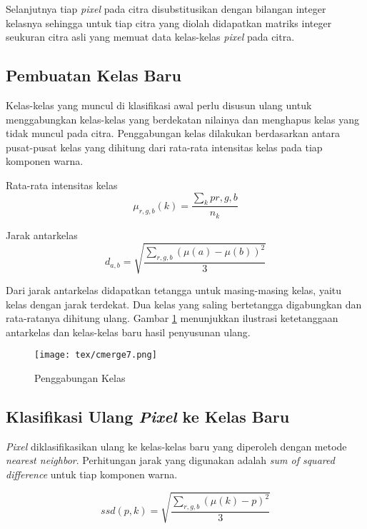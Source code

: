 \documentclass[laporan.tex]{subfiles}
\begin{document}
Selanjutnya tiap \emph{pixel} pada citra disubstitusikan dengan bilangan integer kelasnya sehingga untuk tiap citra yang diolah didapatkan matriks integer seukuran citra asli yang memuat data kelas-kelas \emph{pixel} pada citra.

\subsection{Pembuatan Kelas Baru}

Kelas-kelas yang muncul di klasifikasi awal perlu disusun ulang untuk menggabungkan kelas-kelas yang berdekatan nilainya dan menghapus kelas yang tidak muncul pada citra. Penggabungan kelas dilakukan berdasarkan antara pusat-pusat kelas yang dihitung dari rata-rata intensitas kelas pada tiap komponen warna.

Rata-rata intensitas kelas
\begin{equation}
	\mu_{r,g,b}(k) = \frac{\sum_k p{r,g,b}}{n_k}
\end{equation}

Jarak antarkelas
\begin{equation}
	d_{a,b} = \sqrt{\frac{\sum_{r,g,b} (\mu(a) - \mu(b))^2}{3}}
\end{equation}

Dari jarak antarkelas didapatkan tetangga untuk masing-masing kelas, yaitu kelas dengan jarak terdekat. Dua kelas yang saling bertetangga digabungkan dan rata-ratanya dihitung ulang. Gambar \ref{fig:neighborhood} menunjukkan ilustrasi ketetanggaan antarkelas dan kelas-kelas baru hasil penyusunan ulang.

\begin{figure}[h]
\centering
\texttt{[image: tex/cmerge7.png]}
\caption{Penggabungan Kelas}
\label{fig:neighborhood}
\end{figure}

\subsection{Klasifikasi Ulang \emph{Pixel} ke Kelas Baru}

\emph{Pixel} diklasifikasikan ulang ke kelas-kelas baru yang diperoleh dengan metode \emph{nearest neighbor}. Perhitungan jarak yang digunakan adalah \emph{sum of squared difference} untuk tiap komponen warna.

\begin{equation}
ssd(p,k) = \sqrt{\frac{\sum_{r,g,b} (\mu(k) - p)^2}{3}}
\end{equation}
\end{document}
